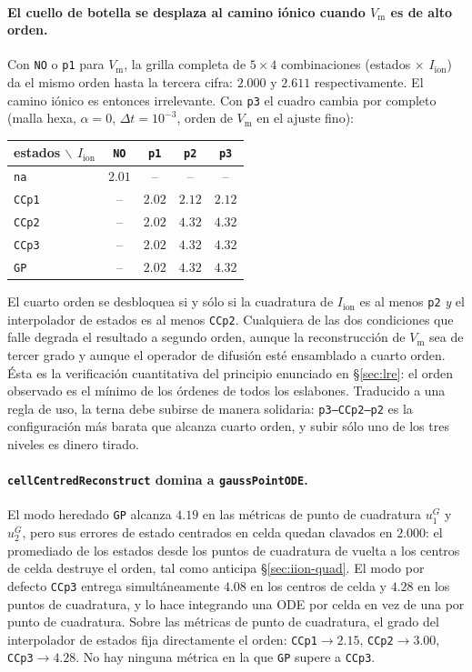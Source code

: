 \documentclass[11pt,a4paper]{article}
\newcommand{\code}[1]{\texttt{\small #1}}
\newcommand{\Vm}{V_{\text{m}}}
\newcommand{\Iion}{I_{\mathrm{ion}}}
\begin{document}
\paragraph{El cuello de botella se desplaza al camino iónico cuando $\Vm$ es de alto orden.}
Con \code{NO} o \code{p1} para $\Vm$, la grilla completa de $5\times4$ combinaciones
(estados $\times$ $\Iion$) da el mismo orden hasta la tercera cifra: $2.000$ y $2.611$
respectivamente. El camino iónico es entonces irrelevante. Con \code{p3} el cuadro cambia por
completo (malla hexa, $\alpha=0$, $\Delta t=10^{-3}$, orden de $\Vm$ en el ajuste fino):
\begin{center}
\begin{tabular}{@{}lcccc@{}}
\toprule
estados $\backslash$ $\Iion$ & \code{NO} & \code{p1} & \code{p2} & \code{p3} \\
\midrule
\code{na}   & $2.01$ & --     & --     & --     \\
\code{CCp1} & --     & $2.02$ & $2.12$ & $2.12$ \\
\code{CCp2} & --     & $2.02$ & $\mathbf{4.32}$ & $\mathbf{4.32}$ \\
\code{CCp3} & --     & $2.02$ & $\mathbf{4.32}$ & $\mathbf{4.32}$ \\
\code{GP}   & --     & $2.02$ & $\mathbf{4.32}$ & $\mathbf{4.32}$ \\
\bottomrule
\end{tabular}
\end{center}
El cuarto orden se desbloquea si y sólo si la cuadratura de $\Iion$ es al menos \code{p2}
\emph{y} el interpolador de estados es al menos \code{CCp2}. Cualquiera de las dos condiciones
que falle degrada el resultado a segundo orden, aunque la reconstrucción de $\Vm$ sea de tercer
grado y aunque el operador de difusión esté ensamblado a cuarto orden. Ésta es la
verificación cuantitativa del principio enunciado en \S\ref{sec:lre}: el orden observado es el
mínimo de los órdenes de todos los eslabones. Traducido a una regla de uso, la terna debe
subirse de manera solidaria: \code{p3--CCp2--p2} es la configuración más barata que alcanza
cuarto orden, y subir sólo uno de los tres niveles es dinero tirado.

\paragraph{\code{cellCentredReconstruct} domina a \code{gaussPointODE}.}
El modo heredado \code{GP} alcanza $4.19$ en las métricas de punto de cuadratura $u_1^G$ y
$u_2^G$, pero sus errores de estado centrados en celda quedan clavados en $2.000$: el promediado
de los estados desde los puntos de cuadratura de vuelta a los centros de celda destruye el
orden, tal como anticipa \S\ref{sec:iion-quad}. El modo por defecto \code{CCp3} entrega
simultáneamente $4.08$ en los centros de celda y $4.28$ en los puntos de cuadratura, y lo hace
integrando una ODE por celda en vez de una por punto de cuadratura. Sobre las métricas de punto
de cuadratura, el grado del interpolador de estados fija directamente el orden:
\code{CCp1}$\to2.15$, \code{CCp2}$\to3.00$, \code{CCp3}$\to4.28$. No hay ninguna métrica en la
que \code{GP} supere a \code{CCp3}.
\end{document}
